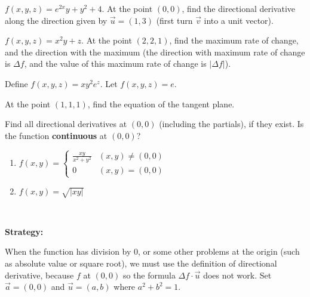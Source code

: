 \documentclass[11pt,fleqn]{book} %
\begin{document}
\begin{enumerate}
\begin{center}
    \end{center}
\end{enumerate}

\begin{exercise}
    $f(x, y, z) = e^{2x}y + y^2 + 4$. At the point $(0, 0)$, find the directional derivative along the direction given by $\vec{u} = (1, 3)$ (first turn $\vec{v}$ into a unit vector). 
\end{exercise}

\begin{exercise}
    $f(x, y, z) = x^2y + z$. At the point $(2, 2, 1)$, find the maximum rate of change, and the direction with the maximum (the direction with maximum rate of change is $\Delta f$, and the value of this maximum rate of change is $| \Delta f |$). 
\end{exercise}

\begin{exercise}
    Define $f(x, y, z) = xy^2e^z$. Let $f(x, y, z) = e$. 

    At the point $(1, 1, 1)$, find the equation of the tangent plane.
\end{exercise}

\begin{exercise}
    Find all directional derivatives at $(0, 0)$ (including the partials), if they exist. Is the function \textbf{continuous} at $(0, 0)$?
    \begin{enumerate}[label=\alph*)]
        \item 
        $f(x, y) = \begin{cases}
            \frac{xy}{x^2 + y^2} & (x, y) \neq (0, 0) \\
            0                    & (x, y) = (0, 0)
        \end{cases}$

        \item $f(x, y) = \sqrt{|xy|}$
    \end{enumerate}

    {~~~}

    \textbf{Strategy:}

    When the function has division by $0$, or some other problems at the origin (such as absolute value or square root), we must use the definition of directional derivative, because $f$  at $(0, 0)$ so the formula $\Delta f \cdot \vec{u}$ does not work. Set $\vec{a} = (0, 0)$ and $\vec{u} = (a, b)$ where $a^2 + b^2 = 1$. 
\end{exercise}
\end{document}

